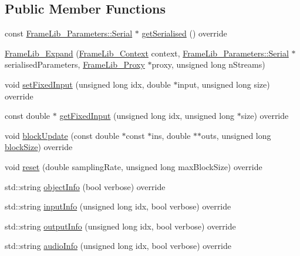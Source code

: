 \subsection*{Public Member Functions}
\begin{DoxyCompactItemize}
\item 
const \hyperlink{class_frame_lib___parameters_1_1_serial}{Frame\+Lib\+\_\+\+Parameters\+::\+Serial} $\ast$ \hyperlink{class_frame_lib___expand_a58eae43d3a0746f20a9d00e9c050b8c8}{get\+Serialised} () override
\item 
\hyperlink{class_frame_lib___expand_ab755d71f4232588304fe43236df3fe92}{Frame\+Lib\+\_\+\+Expand} (\hyperlink{class_frame_lib___context}{Frame\+Lib\+\_\+\+Context} context, \hyperlink{class_frame_lib___parameters_1_1_serial}{Frame\+Lib\+\_\+\+Parameters\+::\+Serial} $\ast$serialised\+Parameters, \hyperlink{struct_frame_lib___proxy}{Frame\+Lib\+\_\+\+Proxy} $\ast$proxy, unsigned long n\+Streams)
\item 
void \hyperlink{class_frame_lib___expand_ae7e72800c3b52698383e333885921ce4}{set\+Fixed\+Input} (unsigned long idx, double $\ast$input, unsigned long size) override
\item 
const double $\ast$ \hyperlink{class_frame_lib___expand_aea5cb729f1e2e69c5db41b53a991e0c6}{get\+Fixed\+Input} (unsigned long idx, unsigned long $\ast$size) override
\item 
void \hyperlink{class_frame_lib___expand_a5601bb681542a7da33a688af0c74c163}{block\+Update} (const double $\ast$const $\ast$ins, double $\ast$$\ast$outs, unsigned long \hyperlink{_frame_lib___memory_8cpp_a8ef7d53a4cac28bf580a61f265fcaaa6}{block\+Size}) override
\item 
void \hyperlink{class_frame_lib___expand_aab1637f19abfa1ca21abb9f2bbff6062}{reset} (double sampling\+Rate, unsigned long max\+Block\+Size) override
\item 
std\+::string \hyperlink{class_frame_lib___expand_ae3cdc7661ba6a00f816e9aaea68ce262}{object\+Info} (bool verbose) override
\item 
std\+::string \hyperlink{class_frame_lib___expand_a0e29df27f7dac1cd8082a468a24fe07e}{input\+Info} (unsigned long idx, bool verbose) override
\item 
std\+::string \hyperlink{class_frame_lib___expand_a0c7a6f0cc3779c6fb6a61fe8e3a8bc60}{output\+Info} (unsigned long idx, bool verbose) override
\item 
std\+::string \hyperlink{class_frame_lib___expand_ab55544cf81d2ea1c9b53db6124eddc88}{audio\+Info} (unsigned long idx, bool verbose) override
$$
\end{DoxyCompactItemize}
